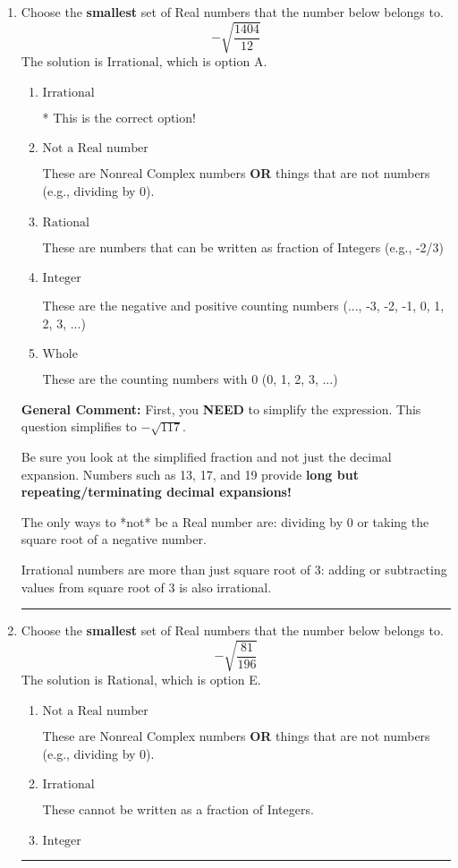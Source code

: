 \documentclass{extbook}[14pt]
\newcommand{\litem}[1]{\item #1

\rule{\textwidth}{0.4pt}}
\begin{document}
\begin{enumerate}\litem{
Choose the \textbf{smallest} set of Real numbers that the number below belongs to.
\[ -\sqrt{\frac{1404}{12}} \]The solution is \( \text{Irrational} \), which is option A.\begin{enumerate}[label=\Alph*.]
\item \( \text{Irrational} \)

* This is the correct option!
\item \( \text{Not a Real number} \)

These are Nonreal Complex numbers \textbf{OR} things that are not numbers (e.g., dividing by 0).
\item \( \text{Rational} \)

These are numbers that can be written as fraction of Integers (e.g., -2/3)
\item \( \text{Integer} \)

These are the negative and positive counting numbers (..., -3, -2, -1, 0, 1, 2, 3, ...)
\item \( \text{Whole} \)

These are the counting numbers with 0 (0, 1, 2, 3, ...)
\end{enumerate}

\textbf{General Comment:} First, you \textbf{NEED} to simplify the expression. This question simplifies to $-\sqrt{117}$. 
 
 Be sure you look at the simplified fraction and not just the decimal expansion. Numbers such as 13, 17, and 19 provide \textbf{long but repeating/terminating decimal expansions!} 
 
 The only ways to *not* be a Real number are: dividing by 0 or taking the square root of a negative number. 
 
 Irrational numbers are more than just square root of 3: adding or subtracting values from square root of 3 is also irrational.
}
\litem{
Choose the \textbf{smallest} set of Real numbers that the number below belongs to.
\[ -\sqrt{\frac{81}{196}} \]The solution is \( \text{Rational} \), which is option E.\begin{enumerate}[label=\Alph*.]
\item \( \text{Not a Real number} \)

These are Nonreal Complex numbers \textbf{OR} things that are not numbers (e.g., dividing by 0).
\item \( \text{Irrational} \)

These cannot be written as a fraction of Integers.
\item \( \text{Integer} \)


\end{enumerate}}
\end{enumerate}
\end{document}
